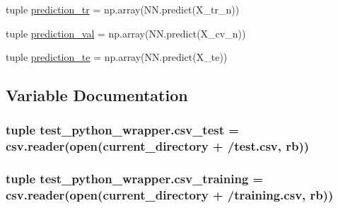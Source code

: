 \begin{DoxyCompactItemize}
\item 
tuple \hyperlink{namespacetest__python__wrapper_ac13fec0366a23feb02327f898755f543}{prediction\+\_\+tr} = np.\+array(N\+N.\+predict(X\+\_\+tr\+\_\+n))
\item 
tuple \hyperlink{namespacetest__python__wrapper_a02c6c99c3b792f419918a024f32e6186}{prediction\+\_\+val} = np.\+array(N\+N.\+predict(X\+\_\+cv\+\_\+n))
\item 
tuple \hyperlink{namespacetest__python__wrapper_a528e8d70107086ac3d5cae063362b480}{prediction\+\_\+te} = np.\+array(N\+N.\+predict(X\+\_\+te))
\end{DoxyCompactItemize}


\subsection{Variable Documentation}
\hypertarget{namespacetest__python__wrapper_ae20ea0207ae3cf3032591f41c625031b}{}
\subsubsection[{csv\+\_\+test}]{\setlength{\rightskip}{0pt plus 5cm}tuple test\+\_\+python\+\_\+wrapper.\+csv\+\_\+test = csv.\+reader(open({\bf current\+\_\+directory} + \textquotesingle{}/test.\+csv\textquotesingle{}, \textquotesingle{}rb\textquotesingle{}))}\label{namespacetest__python__wrapper_ae20ea0207ae3cf3032591f41c625031b}
\hypertarget{namespacetest__python__wrapper_ac5d9b5723c691a9af92807d96792235a}{}
\subsubsection[{csv\+\_\+training}]{\setlength{\rightskip}{0pt plus 5cm}tuple test\+\_\+python\+\_\+wrapper.\+csv\+\_\+training = csv.\+reader(open({\bf current\+\_\+directory} + \textquotesingle{}/training.\+csv\textquotesingle{}, \textquotesingle{}rb\textquotesingle{}))}\label{namespacetest__python__wrapper_ac5d9b5723c691a9af92807d96792235a}
\hypertarget{namespacetest__python__wrapper_a59fd1bc3247bb0acb40d8cbf871143b9}{}
